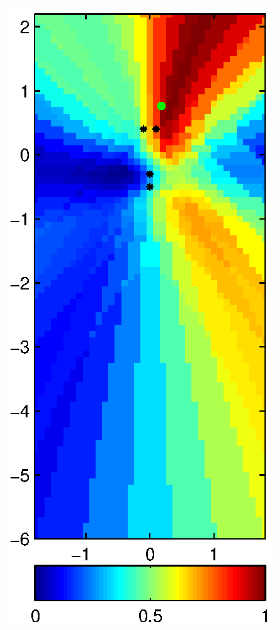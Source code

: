 \documentclass[spanish,openright]{book}
\begin{document}
\begin{figure}
\begin{subfigure}[t]{0.47\textwidth}
\begin{minipage}[t]{\textwidth}
\begin{subfigure}[t]{0.3\textwidth}
\label{fig:SRP_pos16}
\end{subfigure}
\begin{subfigure}[t]{0.3\textwidth}
\includegraphics[width=\textwidth]{SRP_Fo1500_mean_pos16}

\end{subfigure}
\end{minipage}
\end{subfigure}
\end{figure}
\end{document}
